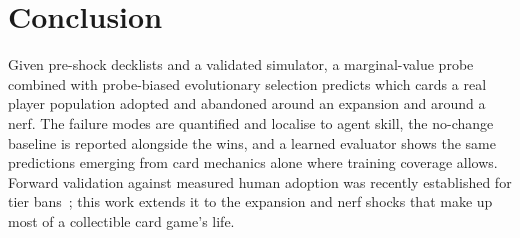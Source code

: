 \documentclass[conference]{IEEEtran}
\begin{document}
\section{Conclusion}

Given pre-shock decklists and a validated simulator, a
marginal-value probe combined with probe-biased evolutionary
selection predicts which cards a real player population adopted and
abandoned around an expansion and around a nerf. The failure modes
are quantified and localise to agent skill, the no-change baseline
is reported alongside the wins, and a learned evaluator shows the
same predictions emerging from card mechanics alone where training
coverage allows. Forward validation against measured human
adoption was recently established for tier
bans~\cite{saravanan2024meta}; this work extends it to the
expansion and nerf shocks that make up most of a collectible card
game's life.
\end{document}
